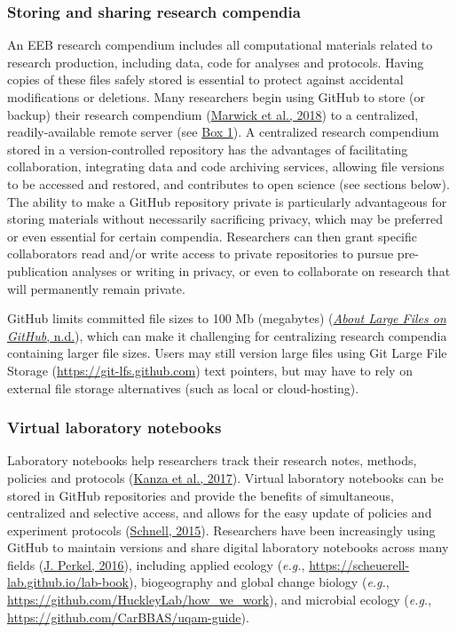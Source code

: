 \hypertarget{storing-and-sharing-research-compendia}{%
\subsubsection{Storing and sharing research compendia}\label{storing-and-sharing-research-compendia}}

An EEB research compendium includes all computational materials related to research production, including data, code for analyses and protocols.
Having copies of these files safely stored is essential to protect against accidental modifications or deletions.
Many researchers begin using GitHub to store (or backup) their research compendium (\protect\hyperlink{ref-MwwMapRG}{Marwick et al., 2018}) to a centralized, readily-available remote server (see \protect\hyperlink{definitions}{Box 1}).
A centralized research compendium stored in a version-controlled repository has the advantages of facilitating collaboration, integrating data and code archiving services, allowing file versions to be accessed and restored, and contributes to open science (see sections below).
The ability to make a GitHub repository private is particularly advantageous for storing materials without necessarily sacrificing privacy, which may be preferred or even essential for certain compendia.
Researchers can then grant specific collaborators read and/or write access to private repositories to pursue pre-publication analyses or writing in privacy, or even to collaborate on research that will permanently remain private.

GitHub limits committed file sizes to 100 Mb (megabytes) (\protect\hyperlink{ref-1Co6ZZjF1}{\emph{About Large Files on GitHub}, n.d.}), which can make it challenging for centralizing research compendia containing larger file sizes.
Users may still version large files using Git Large File Storage (\url{https://git-lfs.github.com}) text pointers, but may have to rely on external file storage alternatives (such as local or cloud-hosting).

\hypertarget{virtual-laboratory-notebooks}{%
\subsubsection{Virtual laboratory notebooks}\label{virtual-laboratory-notebooks}}

Laboratory notebooks help researchers track their research notes, methods, policies and protocols (\protect\hyperlink{ref-wwHxTOtm}{Kanza et al., 2017}).
Virtual laboratory notebooks can be stored in GitHub repositories and provide the benefits of simultaneous, centralized and selective access, and allows for the easy update of policies and experiment protocols (\protect\hyperlink{ref-10V7x4H4l}{Schnell, 2015}).
Researchers have been increasingly using GitHub to maintain versions and share digital laboratory notebooks across many fields (\protect\hyperlink{ref-10ghgV3S8}{J. Perkel, 2016}), including applied ecology (\emph{e.g.}, \url{https://scheuerell-lab.github.io/lab-book}), biogeography and global change biology (\emph{e.g.}, \url{https://github.com/HuckleyLab/how_we_work}), and microbial ecology (\emph{e.g.}, \url{https://github.com/CarBBAS/uqam-guide}).

